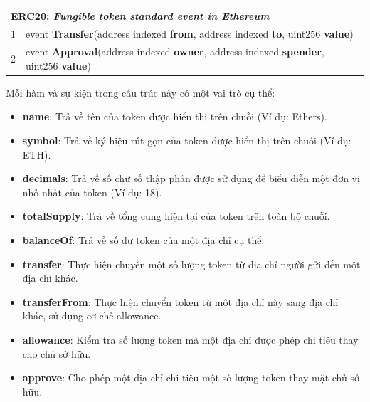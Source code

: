 \begin{center}
    \begin{tabular}{c p{}}
        \hline
        \multicolumn{2}{l}{\textbf{ERC20:} \textit{Fungible token standard
                event in
                Ethereum}}
        \\ \hline
        1 & \hspace{1em} event \textbf{Transfer}(address indexed \textbf{from},
        address indexed \textbf{to}, uint256 \textbf{value})
        \\
        2 & \hspace{1em} event \textbf{Approval}(address indexed
        \textbf{owner},
        address indexed \textbf{spender}, uint256 \textbf{value})
        \\
        \hline
    \end{tabular}
\end{center}

\hspace{-1cm}Mỗi hàm và sự kiện trong cấu trúc này có một vai trò cụ thể:
\begin{itemize}
    \item \textbf{name}: Trả về tên của token được hiển thị trên chuỗi (Ví
          dụ: Ethers).

    \item \textbf{symbol}: Trả về ký hiệu rút gọn của token được hiển thị trên
          chuỗi (Ví dụ: ETH).

    \item \textbf{decimals}: Trả về số chữ số thập phân được sử dụng để biểu
          diễn một đơn vị nhỏ nhất của token (Ví dụ: 18).

    \item \textbf{totalSupply}: Trả về tổng cung hiện tại của token trên toàn
          bộ chuỗi.

    \item \textbf{balanceOf}: Trả về số dư token của một địa chỉ cụ thể.

    \item \textbf{transfer}: Thực hiện chuyển một số lượng token từ địa chỉ
          người gửi đến một địa chỉ khác.

    \item \textbf{transferFrom}: Thực hiện chuyển token từ một địa chỉ này sang
          địa chỉ khác, sử dụng cơ chế allowance.

    \item \textbf{allowance}: Kiểm tra số lượng token mà một địa chỉ được phép
          chi tiêu thay cho chủ sở hữu.

    \item \textbf{approve}: Cho phép một địa chỉ chi tiêu một số lượng token
          thay mặt chủ sở hữu.
\end{itemize}

